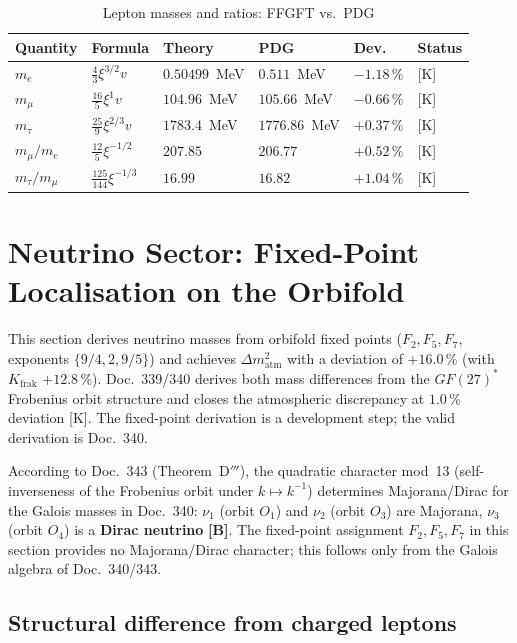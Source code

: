 \begin{table}[h]
\centering
\caption{Lepton masses and ratios: FFGFT vs.\ PDG}
\label{tab:leptons_comp}
\begin{tabular}{llllll}
\toprule
Quantity & Formula & Theory & PDG & Dev. & Status \\
\midrule
$m_e$          & $\frac{4}{3}\xi^{3/2}v$ & $0.50499$~MeV   & $0.511$~MeV   & $-1.18\,\%$ & [K] \\
$m_\mu$        & $\frac{16}{5}\xi^1 v$   & $104.96$~MeV  & $105.66$~MeV  & $-0.66\,\%$ & [K] \\
$m_\tau$       & $\frac{25}{9}\xi^{2/3}v$ & $1783.4$~MeV & $1776.86$~MeV & $+0.37\,\%$ & [K] \\
$m_\mu/m_e$    & $\frac{12}{5}\xi^{-1/2}$ & $207.85$ & $206.77$ & $+0.52\,\%$ & [K] \\
$m_\tau/m_\mu$ & $\frac{125}{144}\xi^{-1/3}$ & $16.99$ & $16.82$ & $+1.04\,\%$ & [K] \\
\bottomrule
\end{tabular}
\end{table}

\section{Neutrino Sector: Fixed-Point Localisation on the Orbifold}

This section derives neutrino masses from orbifold fixed points
($F_2, F_5, F_7$, exponents $\{9/4,2,9/5\}$) and achieves
$\Delta m^2_\text{atm}$ with a deviation of $+16.0\,\%$ (with
$K_\text{frak}$ $+12.8\,\%$). Doc.~339/340 derives both mass differences
from the $GF(27)^*$ Frobenius orbit structure and closes the atmospheric
discrepancy at $1.0\,\%$ deviation [K]. The fixed-point derivation is a
development step; the valid derivation is Doc.~340.

According to Doc.~343 (Theorem~D$'''$), the quadratic
character mod~13 (self-inverseness of the Frobenius orbit under $k\mapsto k^{-1}$)
determines Majorana/Dirac for the Galois masses in Doc.~340: $\nu_1$ (orbit $O_1$)
and $\nu_2$ (orbit $O_3$) are Majorana, $\nu_3$ (orbit $O_4$) is a
\textbf{Dirac neutrino} \textbf{[B]}. The fixed-point assignment $F_2,F_5,F_7$ in
this section provides no Majorana/Dirac character; this follows only from the
Galois algebra of Doc.~340/343.

\subsection{Structural difference from charged leptons}

